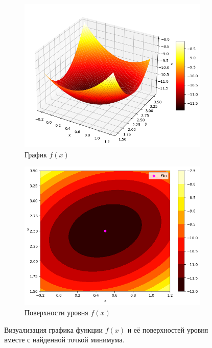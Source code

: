 \documentclass[12pt]{article}%
\begin{document}
\newpage
\begin{figure}[!h]
\centering
\begin{subfigure}{0.45\textwidth}
    \includegraphics[width=\textwidth]{task4_surface.png}
    \caption{График $f(x)$}
\end{subfigure}
\hfill
\begin{subfigure}{0.45\textwidth}
    \includegraphics[width=\textwidth]{task4_contour.png}
    \caption{Поверхности уровня $f(x)$}
\end{subfigure}

\caption{Визуализация графика функции $f(x)$ и её поверхностей уровня вместе с найденной точкой минимума.}
\end{figure}
\end{document}
